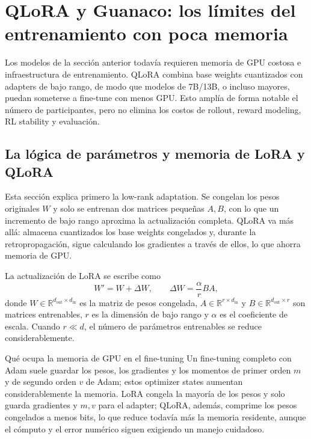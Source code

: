 \section{QLoRA y Guanaco: los límites del entrenamiento con poca memoria}

Los modelos de la sección anterior todavía requieren memoria de GPU costosa e infraestructura de entrenamiento. QLoRA combina base weights cuantizados con adapters de bajo rango, de modo que modelos de 7B/13B, o incluso mayores, puedan someterse a fine-tune con menos GPU. Esto amplía de forma notable el número de participantes, pero no elimina los costos de rollout, reward modeling, RL stability y evaluación.

\subsection{La lógica de parámetros y memoria de LoRA y QLoRA}

Esta sección explica primero la low-rank adaptation. Se congelan los pesos originales $W$ y solo se entrenan dos matrices pequeñas $A,B$, con lo que un incremento de bajo rango aproxima la actualización completa. QLoRA va más allá: almacena cuantizados los base weights congelados y, durante la retropropagación, sigue calculando los gradientes a través de ellos, lo que ahorra memoria de GPU.


La actualización de LoRA se escribe como
\[
W'=W+\Delta W,
\qquad \Delta W=\frac{\alpha}{r}BA,
\]
donde $W\in\mathbb{R}^{d_{\mathrm{out}}\times d_{\mathrm{in}}}$ es la matriz de pesos congelada, $A\in\mathbb{R}^{r\times d_{\mathrm{in}}}$ y $B\in\mathbb{R}^{d_{\mathrm{out}}\times r}$ son matrices entrenables, $r$ es la dimensión de bajo rango y $\alpha$ es el coeficiente de escala. Cuando $r\ll d$, el número de parámetros entrenables se reduce considerablemente.


\begin{knowledgebox}{Qué ocupa la memoria de GPU en el fine-tuning}
Un fine-tuning completo con Adam suele guardar los pesos, los gradientes y los momentos de primer orden $m$ y de segundo orden $v$ de Adam; estos optimizer states aumentan considerablemente la memoria. LoRA congela la mayoría de los pesos y solo guarda gradientes y $m,v$ para el adapter; QLoRA, además, comprime los pesos congelados a menos bits, lo que reduce todavía más la memoria residente, aunque el cómputo y el error numérico siguen exigiendo un manejo cuidadoso.
\end{knowledgebox}

